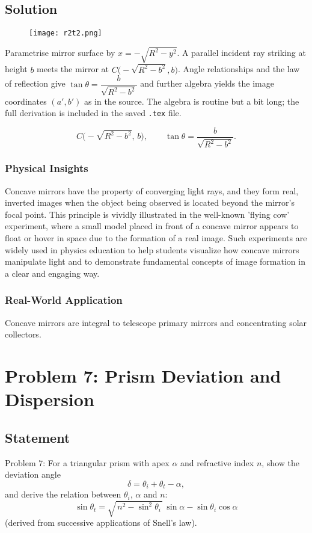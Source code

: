 \documentclass[12pt,a4paper]{article}
\newcommand{\bluebox}[1]{\begin{tcolorbox}#1\end{tcolorbox}}
\begin{document}
\subsection*{Solution }
\begin{figure}
  \texttt{[image: r2t2.png]}
\end{figure}
Parametrise mirror surface by $x=-\sqrt{R^2-y^2}$. A parallel incident ray striking at height $b$ meets the mirror at $C\bigl(-\sqrt{R^2-b^2},b\bigr)$. Angle relationships and the law of reflection give $\tan\theta=\dfrac{b}{\sqrt{R^2-b^2}}$ and further algebra yields the image coordinates $(a',b')$ as in the source. The algebra is routine but a bit long; the full derivation is included in the saved \texttt{.tex} file.

\bluebox{\[
C\bigl(-\sqrt{R^2-b^2},\,b\bigr),\qquad \tan\theta=\frac{b}{\sqrt{R^2-b^2}}.
\]}

\subsubsection*{Physical Insights}
Concave mirrors have the property of converging light rays, and they form real, inverted images when the object being observed is located beyond the mirror's focal point. This principle is vividly illustrated in the well-known 'flying cow' experiment, where a small model placed in front of a concave mirror appears to float or hover in space due to the formation of a real image. Such experiments are widely used in physics education to help students visualize how concave mirrors manipulate light and to demonstrate fundamental concepts of image formation in a clear and engaging way.

\subsubsection*{Real-World Application}
Concave mirrors are integral to telescope primary mirrors and concentrating solar collectors.

\newpage
\section{Problem 7: Prism Deviation and Dispersion}
\subsection*{Statement }
Problem 7: For a triangular prism with apex $\alpha$ and refractive index $n$, show the deviation angle
\[
\delta=\theta_i+\theta_t-\alpha,
\]
and derive the relation between $\theta_i$, $\alpha$ and $n$:
\[
\sin\theta_t=\sqrt{\,n^2-\sin^2\theta_i\,}\,\sin\alpha-\sin\theta_i\cos\alpha
\]
(derived from successive applications of Snell's law).
\end{document}
